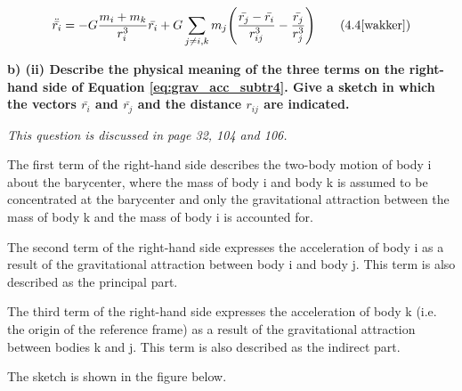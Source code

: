 \begin{equation}
    \ddot{\bar{r_{i}}} = -G \frac{m_{i} + m_{k}}{r_{i}^3} \bar{r_{i}} + G\sum_{j \neq i,k}^{} m_{j} \Bigg( \frac{\bar{r_{j}} - \bar{r_{i}}}{r_{ij}^3} - \frac{\bar{r_{j}}}{r_{j}^3} \Bigg)
    \tag{4.4\cite{wakker}}
    \label{eq:grav_acc_subtr4}
\end{equation}










\noindent \textbf{b) (ii) Describe the physical meaning of the three terms on the right-hand side of Equation \ref{eq:grav_acc_subtr4}. Give a sketch in which the vectors $\bar{r_i}$ and $\bar{r_j}$ and the distance $r_{ij}$ are indicated.}

\bigskip

\noindent \textit{This question is discussed in \cite{wakker} page 32, 104 and 106.}

\bigskip

\noindent The first term of the right-hand side describes the two-body motion of body i about the barycenter, where the mass of body i and body k is assumed to be concentrated at the barycenter and only the gravitational attraction between the mass of body k and the mass of body i is accounted for.

\bigskip

\noindent The second term of the right-hand side expresses the acceleration of body i as a result of the gravitational attraction between body i and body j. This term is also described as the principal part.

\bigskip

\noindent The third term of the right-hand side expresses the acceleration of body k (i.e.  the origin of the reference frame) as a result of the gravitational attraction between bodies k and j. This term is also described as the indirect part.

\bigskip

\noindent The sketch is shown in the figure below.

